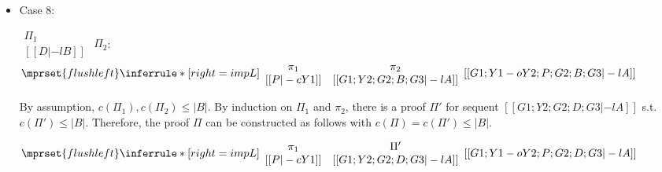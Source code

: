 \begin{itemize}
\item Case 8:
      \begin{center}
        \scriptsize
        \begin{math}
          \begin{array}{c}
            \Pi_1 \\
            {[[D |-l B]]}
          \end{array}
        \end{math}
        \qquad\qquad
        $\Pi_2$:
        \begin{math}
          $$\mprset{flushleft}
          \inferrule* [right={\tiny impL}] {
            {
              \begin{array}{cc}
                \pi_1 & \pi_2 \\
                {[[P |-c Y1]]} & {[[G1; Y2; G2; B; G3 |-l A]]}
              \end{array}
            }
          }{[[G1; Y1 -o Y2; P; G2; B; G3 |-l A]]}
        \end{math}
      \end{center}
      By assumption, $c(\Pi_1),c(\Pi_2)\leq |B|$. By induction on $\Pi_1$
      and $\pi_2$, there is a proof $\Pi'$ for sequent
      $[[G1; Y2; G2; D; G3 |-l A]]$ s.t. $c(\Pi') \leq |B|$. Therefore,
      the proof $\Pi$ can be constructed as follows with
      $c(\Pi) = c(\Pi') \leq |B|$.
      \begin{center}
        \scriptsize
        \begin{math}
          $$\mprset{flushleft}
          \inferrule* [right={\tiny impL}] {
            {
              \begin{array}{cc}
                \pi_1 & \Pi' \\
                {[[P |-c Y1]]} & {[[G1; Y2; G2; D; G3 |-l A]]}
              \end{array}
            }
          }{[[G1; Y1 -o Y2; P; G2; D; G3 |-l A]]}
        \end{math}
      \end{center}
\end{itemize}



